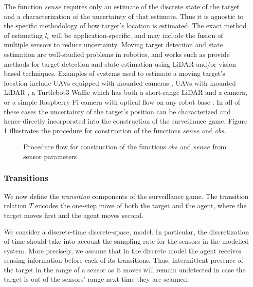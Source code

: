 The function $sense$ requires only an estimate of the discrete state of the target and a characterization of the uncertainty of that estimate. Thus it is agnostic to the specific methodology of how target's location is estimated. The exact method of estimating $l_t$ will be application-specific, and may include the fusion of multiple sensors to reduce uncertainty. Moving target detection and state estimation are well-studied problems in robotics, and works such as \cite{niazi2014,mendes2004,sun2016} provide methods for target detection and state estimation using LiDAR and/or vision based techniques. Examples of systems used to estimate a moving target's location include UAVs equipped with mounted cameras \cite{dobrokhodov2006vision,teuliere2011chasing}, UAVs with mounted LiDAR \cite{tulldahl2015accuracy}, a Turtlebot3 Waffle which has both a short-range LiDAR and a camera, or a simple Raspberry Pi camera with optical flow on any robot base \cite{kale2015}. In all of these cases the uncertainty of the target's position can be characterized and hence directly incorporated into the construction of the surveillance game. Figure \ref{fig:obsfunction} illustrates the procedure for construction of the functions $sense$ and $obs$.

\begin{figure}[h!]

    \caption{Procedure flow for construction of the functions $obs$ and $sense$ from sensor parameters}
    \label{fig:obsfunction}
\end{figure}


\subsubsection{Transitions} We now define the \emph{transition} components of the surveillance game. 
The transition relation $T$ encodes the one-step move of both the target and the agent, where the target moves first and the agent moves second. 

We consider a discrete-time discrete-space, model. In particular, the discretization of time should take into account the sampling rate for the sensors in the modelled system. More precisely, we assume that in the discrete model the agent receives sensing information before each of its transitions. Thus, intermittent presence of the target in the range of a sensor as it moves will remain undetected in case the target is out of the sensors' range next time they are scanned.

